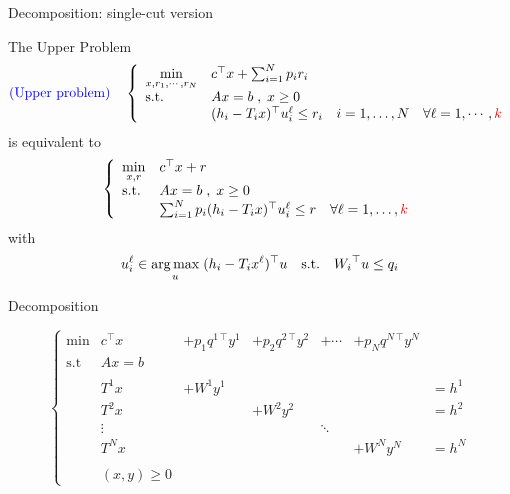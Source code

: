 \begin{frame}{Decomposition: single-cut version}

The Upper Problem
\[
\text{{\color{blue}(Upper problem)}}\quad
\left\{
\begin{array}{llll}
  \displaystyle \min_{x,r_1, \cdots, r_N} &c^\top x + \sum_{i=1}^N p_i r_i \\
\mbox{s.t.} & Ax = b \;, \; x\geq 0\\
            & (h_i- T_i x)^\top u_i^\ell \leq r_i & i=1,\ldots,N \quad \forall \ell=1,\cdots, {\color{red}k}
\end{array}
\right.
\]
is equivalent to
\[
 \left\{
\begin{array}{llll}
\displaystyle \min_{x,r} &c^\top x + r\\
\mbox{s.t.} & Ax = b \;,\; x\geq 0\\
             & \sum_{i=1}^N p_i({h_i}- {T_i}x)^\top u_i^\ell \leq r & \forall \ell=1,\ldots,{\color{red}k}
\end{array}
\right.
\]
with
\[
u_i^\ell \in\mathop{\rm arg\,max}_u \;({h_i}- {T_i}x^\ell)^\top {u}  \quad \mbox{s.t.} \quad
{W_i}^\top u \leq q_i
\]
\end{frame}

\begin{frame}{Decomposition}

\[
\left\{
\begin{array}{lllllllllllll}
\min & c^\top x &+ p_1q^{1\,\top} y^1  &+ p_2q^{2\,\top} y^2 &+ \cdots  &+ p_Nq^{N\,\top} y^N \\
\mbox{s.t}& Ax =b\\
&\\
& T^1x           &+ W^1y^1&&&&= h^1 \\
& T^2x           &&+ W^2y^2&&&= h^2 \\
& \vdots         &&&\ddots \\
& T^Nx           &&&&+ W^Ny^N&= h^N \\
&\\
&(x, y)\geq 0
\end{array}
\right.
\]
\end{frame}


